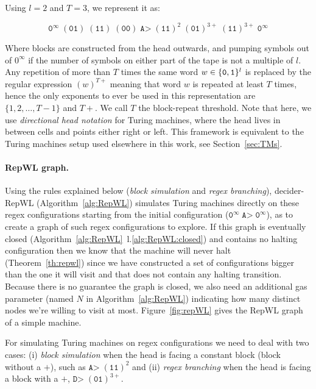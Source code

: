 Using $l=2$ and $T = 3$, we represent it as:

$$ \texttt{0}^\infty \; (\texttt{01}) \; (\texttt{11}) \; (\texttt{00}) \; \texttt{A>} \; (\texttt{11})^2 \; (\texttt{01})^{3+} \; (\texttt{11})^{3+} \; \texttt{0}^\infty $$

Where blocks are constructed from the head outwards, and pumping symbols \szero out of $0^\infty$ if the number of symbols on either part of the tape is not a multiple of $l$. Any repetition of more than $T$ times the same word $w \in \{\texttt{0},\texttt{1}\}^l$ is replaced by the regular expression $(w)^{T+}$ meaning that word $w$ is repeated at least $T$ times, hence the only exponents to ever be used in this representation are $\{1,2,\dots,T-1\}$ and $T+$. We call $T$ the block-repeat threshold. Note that here, we use \textit{directional head notation} for Turing machines, where the head lives in between cells and points either right or left. This framework is equivalent to the Turing machines setup used elsewhere in this work, see Section~\ref{sec:TMs}.

\paragraph{RepWL graph.} Using the rules explained below (\textit{block simulation} and \textit{regex branching}), {\sc decider-RepWL} (Algorithm~\ref{alg:RepWL}) simulates Turing machines directly on these regex configurations starting from the initial configuration (\ie $\texttt{0}^\infty \; \texttt{A>} \; \texttt{0}^\infty$), as to create a graph of such regex configurations to explore. If this graph is eventually closed (Algorithm~\ref{alg:RepWL}~l.\ref{alg:RepWL:closed}) and contains no halting configuration then we know that the machine will never halt (Theorem~\ref{th:repwl}) since we have constructed a set of configurations bigger than the one it will visit and that does not contain any halting transition. Because there is no guarantee the graph is closed, we also need an additional gas parameter (named $N$ in Algorithm~\ref{alg:RepWL}) indicating how many distinct nodes we're willing to visit at most. Figure~\ref{fig:repWL} gives the RepWL graph of a simple machine.

For simulating Turing machines on regex configurations we need to deal with two cases: (i) \textit{block simulation} when the head is facing a constant block (\ie block without a $+$), such as $\texttt{A>} \; (\texttt{11})^2$ and (ii) \textit{regex branching} when the head is facing a block with a $+$, \eg $\texttt{D>} \; (\texttt{01})^{3+}$.

